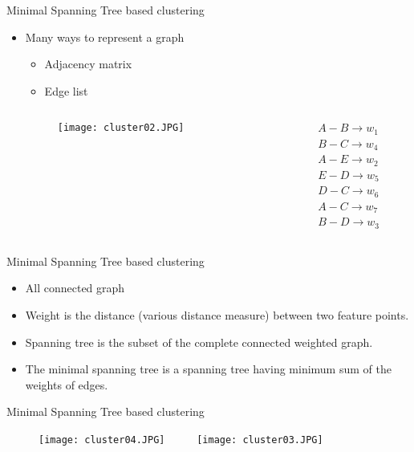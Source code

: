 \begin{frame}{Minimal Spanning Tree based clustering}
\begin{itemize}
\item Many ways to represent a graph
\begin{itemize}
\item Adjacency matrix
\item Edge list
\end{itemize}
\begin{columns}
\begin{column}{5cm}
\begin{figure}
\texttt{[image: cluster02.JPG]}
\end{figure}
\end{column}
\begin{column}{5cm}
\begin{align}
A-B \rightarrow w_1\nonumber\\
B-C \rightarrow w_4\nonumber\\
A-E \rightarrow w_2\nonumber\\
E-D \rightarrow w_5\nonumber\\
D-C \rightarrow w_6\nonumber\\
A-C \rightarrow w_7\nonumber\\
B-D \rightarrow w_3\nonumber
\end{align}
\end{column}
\end{columns}
\end{itemize}
\end{frame}

\begin{frame}{Minimal Spanning Tree based clustering}
\begin{itemize}
\item All connected graph
\item Weight is the distance (various distance measure) between two feature points.
\item Spanning tree is the subset of the complete connected weighted graph.
\item The minimal spanning tree is a spanning tree having minimum sum of the weights of edges.
\end{itemize}
\end{frame}

\begin{frame}{Minimal Spanning Tree based clustering}
\begin{figure}
\texttt{[image: cluster04.JPG]}~~~~~
\texttt{[image: cluster03.JPG]}
\end{figure}
\end{frame}

